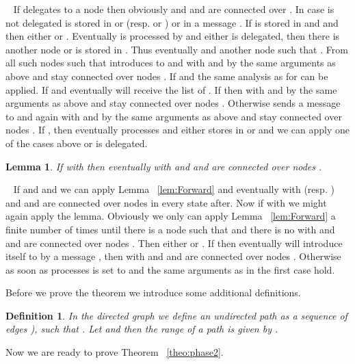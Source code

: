 \documentclass[11pt]{article}
\newtheorem{lemma}[theorem]{Lemma}
\newtheorem{definition}[theorem]{Definition}
\newcommand{\sq}{\hbox{\rlap{}}}
\newcommand{\qed}{\hspace*{\fill}\sq}
\newenvironment{proof}{\noindent {\bf Proof.}\ }{\qed\par\vskip 4mm\par}
\begin{document}
\begin{proof}
If  delegates  to a node  then obviously  and  and  are connected over .
In case  is not delegated  is stored in  or  (resp.  or ) or in a message . If  is stored in  and   and  then either  or . Eventually  is processed by  and either  is delegated, then there is another node  or  is stored in . Thus eventually  and another node  such that . From all such nodes  such that   introduces  to  and  with  and by the same arguments as above  and  stay connected over nodes .
If  and  the same analysis as for  can be applied. If  and  eventually  will receive the  list of . If  then  with  and by the same arguments as above  and  stay connected over nodes . Otherwise  sends a message  to  and again  with  and by the same arguments as above  and  stay connected over nodes .
If , then eventually  processes  and either stores  in  or  and we can apply one of the cases above or  is delegated.
\end{proof}

\begin{lemma}\label{lem:Mirror}
If  with  then eventually  with  and  and  are connected over nodes .
\end{lemma}

\begin{proof}
If  and  and  we can apply Lemma ~\ref{lem:Forward} and eventually  with  (resp. ) and  and  are connected over nodes   in every state after. Now if  with  we might again apply the lemma. Obviously we only can apply Lemma ~\ref{lem:Forward} a finite number of times until there is a node  such that  and there is no  with  and  and  are connected over nodes . Then either  or . If  then eventually  will introduce itself to  by a message , then  with  and  and  are connected over nodes  .
Otherwise as soon as  processes   is set to  and the same arguments as in the first case hold.
\end{proof}

Before we prove the theorem we introduce some additional definitions.

\begin{definition}
In the directed graph we define an \emph{undirected path}  as a sequence of edges  \newline ), such that . Let  and  then the \emph{range of a path}  is given by .
\end{definition}

Now we are ready to prove Theorem ~\ref{theo:phase2}.
\end{document}
